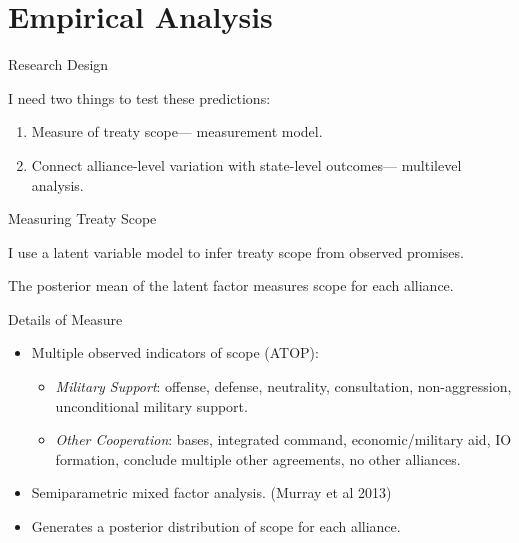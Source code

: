 \documentclass{beamer}
\begin{document}

\section{Empirical Analysis} 


\begin{frame}{Research Design}

I need two things to test these predictions: 

\pause 
\begin{enumerate} 
\item Measure of treaty scope--- measurement model. 
\pause
\item Connect alliance-level variation with state-level outcomes--- multilevel analysis.  
\end{enumerate} 


\end{frame}


\begin{frame}{Measuring Treaty Scope}

I use a latent variable model to infer treaty scope from observed promises. 

\pause 

The posterior mean of the latent factor measures scope for each alliance. 

\end{frame} 


\begin{frame}{Details of Measure}
 
\begin{itemize}
\item Multiple observed indicators of scope (ATOP): 
\begin{itemize} 
\item \textit{Military Support}: offense, defense, neutrality, consultation, non-aggression, unconditional military support.
\item \textit{Other Cooperation}: bases, integrated command, economic/military aid, IO formation, conclude multiple other agreements, no other alliances. 
\end{itemize} 
\pause 
\item Semiparametric mixed factor analysis. (Murray et al 2013)
\pause
\item Generates a posterior distribution of scope for each alliance.
\end{itemize} 


\end{frame} 
\end{document}
